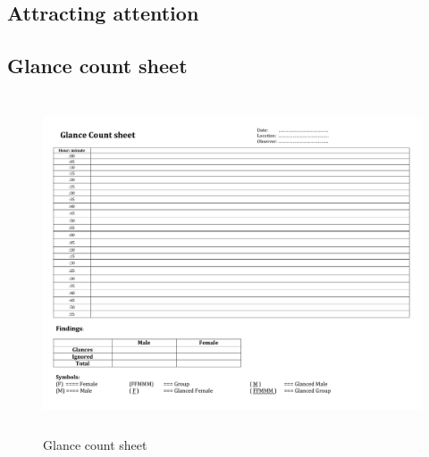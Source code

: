 
\begin{appendices}



\chapter{Attracting attention}

\section {Glance count sheet}

\begin{figure}[H]
 \centering 
    \includegraphics[width=\textwidth,height=100mm]{Appendices/3/Glance_Count_Method.pdf}
    \caption{Glance count sheet}
     \label{app:Glance_Count_Method}%
\end{figure}



\end{appendices}
